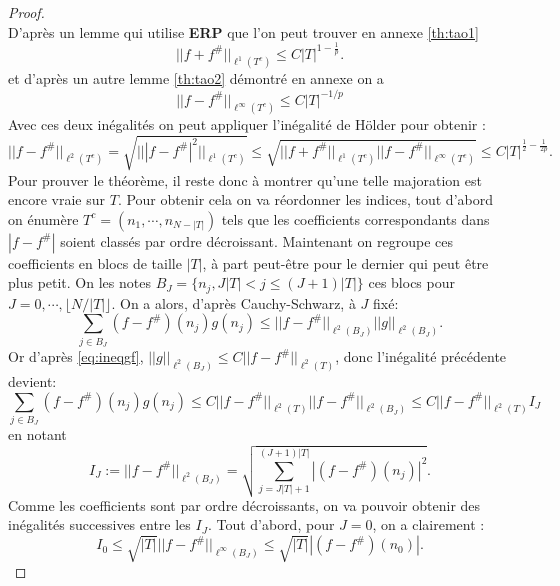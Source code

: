 \begin{proof}
\begin{equation}
	\end{equation}
	D'après un lemme qui utilise \textbf{ERP} que l'on peut trouver en annexe \ref{th:tao1} 
	\begin{equation}\label{eq:ineqtc}
		||f + f^\#||_{\ell^1(T^c)} \leq C |T|^{1-\frac{1}{p}}.
	\end{equation}
	et d'après un autre lemme \ref{th:tao2} démontré en annexe on a 
	\begin{equation}\label{eq:ineqinf}
		||f-f^\#||_{\ell^\infty (T^c)} \leq C |T|^{-1/p}
	\end{equation}
	Avec ces deux inégalités on peut appliquer l'inégalité de Hölder pour obtenir :
	\begin{equation}
		||f-f^\#||_{\ell^2(T^c)} = \sqrt{|||f-f^\#|^2||_{\ell^1(T^c)}} \leq \sqrt{||f + f^\#||_{\ell^1(T^c)} 	||f-f^\#||_{\ell^\infty (T^c)}} \leq C |T|^{\frac{1}{2} - \frac{1}{2p}}.
	\end{equation}
	Pour prouver le théorème, il reste donc à montrer qu'une telle majoration est encore vraie sur $T$.
	Pour obtenir cela on va réordonner les indices, tout d'abord on énumère $T^c=(n_1, \cdots, n_{N-|T|})$ tels que les coefficients correspondants dans $|f-f^\#|$ soient classés par ordre décroissant.
	Maintenant on regroupe ces coefficients en blocs de taille $|T|$, à part peut-être pour le dernier qui peut être plus petit.
	On les notes $B_J =\{n_j, J|T| < j \leq (J+1)|T|\}$ ces blocs pour $J=0,\cdots, \lfloor N/|T| \rfloor$.
	On a alors, d'après Cauchy-Schwarz, à $J$ fixé:
	\begin{equation}
		\sum_{j\in B_J} (f-f^\#)(n_j) g(n_j) \leq ||f-f^\#||_{\ell^2(B_J)} ||g||_{\ell^2(B_J)}.
	\end{equation}
	Or d'après \ref{eq:ineqgf}, $||g||_{\ell^2(B_J)} \leq C||f-f^\#||_{\ell^2(T)}$, donc l'inégalité précédente devient:
	\begin{equation}
		\sum_{j\in B_J} (f-f^\#)(n_j) g(n_j) \leq C ||f-f^\#||_{\ell^2(T)} ||f-f^\#||_{\ell^2(B_J)} \leq C ||f-f^\#||_{\ell^2(T)} I_J
	\end{equation}
	en notant
	\begin{equation}
		I_J := ||f-f^\#||_{\ell^2(B_J)} = \sqrt{\sum_{j=J|T| + 1}^{(J+1)|T|} |(f-f^\#)(n_j)|^2}.
	\end{equation}
	Comme les coefficients sont par ordre décroissants, on va pouvoir obtenir des inégalités successives entre les $I_J$.
	Tout d'abord, pour $J=0$, on  a clairement :
	\begin{equation}
		I_0 \leq \sqrt{|T|}||f-f^\#||_{\ell^\infty(B_J)} \leq \sqrt{|T|} |(f-f^\#)(n_0)|.

\end{equation}
\end{proof}
